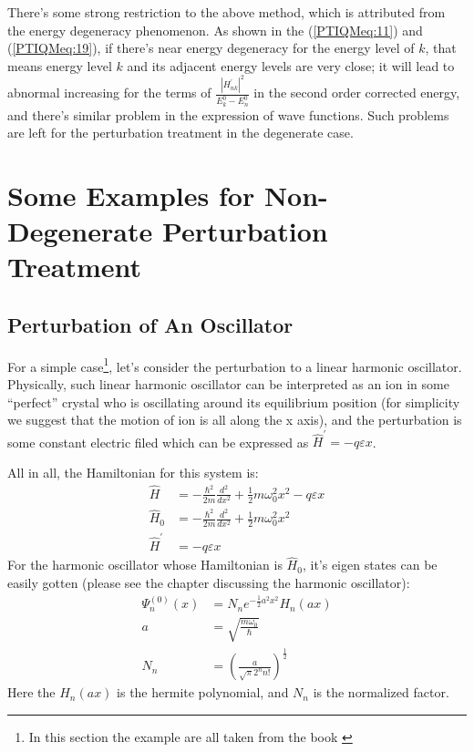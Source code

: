 There's some strong restriction to the above method, which is
attributed from the energy degeneracy phenomenon. As shown in the
(\ref{PTIQMeq:11}) and (\ref{PTIQMeq:19}), if there's near energy
degeneracy for the energy level of $k$, that means energy level $k$
and its adjacent energy levels are very close; it will lead to
abnormal increasing for the terms of
$\frac{|H^{'}_{nk}|^{2}}{E^{0}_{k} - E^{0}_{n}}$ in the second order
corrected energy, and there's similar problem in the expression of
wave functions. Such problems are left for the perturbation
treatment in the degenerate case.

\section{Some Examples for Non-Degenerate Perturbation
Treatment}
%
%
%
\subsection{Perturbation of An Oscillator}
%
%
%
For a simple case\footnote{In this section the example are all taken
from the book \cite{ZengJinYan}}, let's consider the perturbation to
a linear harmonic oscillator. Physically, such linear harmonic
oscillator can be interpreted as an ion in some ``perfect'' crystal
who is oscillating around its equilibrium position (for simplicity
we suggest that the motion of ion is all along the x axis), and the
perturbation is some constant electric filed which can be expressed
as $\hat{H}^{'} = -q\varepsilon x$.

All in all, the Hamiltonian for this system is:
\begin{align}\label{}
\hat{H} &= -\frac{\hbar^{2}}{2m}\frac{d^{2}}{dx^{2}} +
\frac{1}{2}m\omega_{0}^{2}x^{2} - q\varepsilon x \nonumber \\
\hat{H}_{0} &= -\frac{\hbar^{2}}{2m}\frac{d^{2}}{dx^{2}} +
\frac{1}{2}m\omega_{0}^{2}x^{2} \nonumber \\
\hat{H}^{'} &= -q\varepsilon x
\end{align}
For the harmonic oscillator whose Hamiltonian is $\hat{H}_{0}$, it's
eigen states can be easily gotten (please see the chapter discussing
the harmonic oscillator):
\begin{align}\label{}
\Psi_{n}^{(0)}(x) &= N_{n}e^{-\frac{1}{2}a^{2}x^{2}}H_{n}(ax)
\nonumber \\
a &= \sqrt{\frac{m\omega_{0}}{\hbar}} \nonumber \\
N_{n} &= \left(\frac{a}{\sqrt{\pi}2^{n}n!}\right)^{\frac{1}{2}}
\end{align}
Here the $H_{n}(ax)$ is the hermite polynomial, and $N_{n}$ is the
normalized factor.

